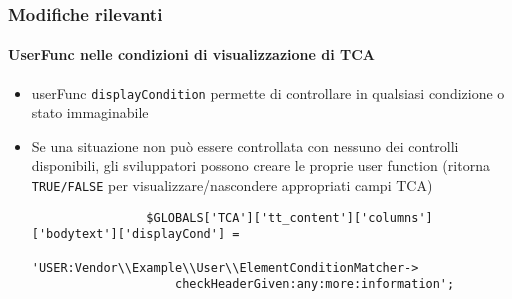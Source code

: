 \begin{frame}[fragile]
	\frametitle{Modifiche rilevanti}
	\framesubtitle{UserFunc nelle condizioni di visualizzazione di TCA}

	\begin{itemize}
		\item userFunc \texttt{displayCondition} permette di controllare in qualsiasi condizione o stato immaginabile
		\item Se una situazione non può essere controllata con nessuno dei controlli disponibili, gli sviluppatori
			possono creare le proprie user function\newline
			(ritorna \texttt{TRUE/FALSE} per visualizzare/nascondere appropriati campi TCA)

			\begin{lstlisting}
				$GLOBALS['TCA']['tt_content']['columns']['bodytext']['displayCond'] =
				  'USER:Vendor\\Example\\User\\ElementConditionMatcher->
				    checkHeaderGiven:any:more:information';
			\end{lstlisting}

	\end{itemize}

\end{frame}


